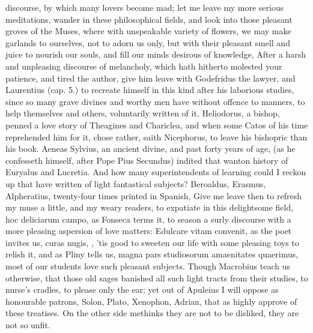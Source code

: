 {discourse, by which many lovers become mad; let me leave my more
serious meditations, wander in these philosophical fields, and look
into those pleasant groves of the Muses, where with unspeakable variety
of flowers, we may make garlands to ourselves, not to adorn us only,
but with their pleasant smell and juice to nourish our souls, and fill
our minds desirous of knowledge, \etc{} After a harsh and unpleasing
discourse of melancholy, which hath hitherto molested your patience,
and tired the author, give him leave with Godefridus the lawyer,
and Laurentius (cap. 5.) to recreate himself in this kind after his
laborious studies, since so many grave divines and worthy men have
without offence to manners, to help themselves and others, voluntarily
written of it. Heliodorus, a bishop, penned a love story of Theagines
and Chariclea, and when some Catos of his time reprehended him for it,
chose rather, saith Nicephorus, to leave his bishopric than his
book. Aeneas Sylvius, an ancient divine, and past forty years of age,
(as he confesseth himself, after Pope Pius Secundus) indited that
wanton history of Euryalus and Lucretia. And how many superintendents
of learning could I reckon up that have written of light fantastical
subjects? Beroaldus, Erasmus, Alpheratius, twenty-four times printed in
Spanish, \etc{} Give me leave then to refresh my muse a little, and my
weary readers, to expatiate in this delightsome field, hoc deliciarum
campo, as Fonseca terms it, to  season a surly discourse with a
more pleasing aspersion of love matters: Edulcare vitam convenit, as
the poet invites us, curas nugis, \etc{}, 'tis good to sweeten our life
with some pleasing toys to relish it, and as Pliny tells us, magna pars
studiosorum amaenitates quaerimus, most of our students love such
pleasant subjects. Though Macrobius teach us otherwise,
that those old sages banished all such light tracts from their
studies, to nurse's cradles, to please only the ear; yet out of
Apuleius I will oppose as honourable patrons, Solon, Plato, 
Xenophon, Adrian, \etc{} that as highly approve of these treatises. On the
other side methinks they are not to be disliked, they are not so unfit.

}
